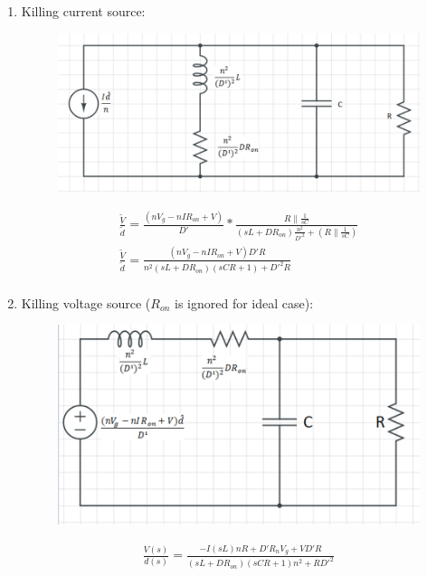 \documentclass{article}
\begin{document}
\begin{enumerate}

    \item Killing current source:
     \begin{figure}[H]
        \centering
        \includegraphics[scale=0.75]{x4.png}
        \label{fig:my_label}
    \end{figure}
    \begin{gather*}
        \frac{\tilde V}{\tilde d}=\frac{(nV_g-nIR_{on}+V)}{D'}*\frac{R\parallel\frac{1}{sC}}{(sL+DR_{on})\frac{n^2}{D'^2}+(R\parallel\frac{1}{sC})}\\
        \frac{\tilde V}{\tilde d}=\frac{(nV_g-nIR_{on}+V)D'R}{n^2(sL+DR_{on})(sCR+1)+D'^2R}\\
    \end{gather*}
    \item Killing voltage source ($R_{on}$ is ignored for ideal case):
     \begin{figure}[H]
        \centering
        \includegraphics[scale=0.75]{x5.png}
        \label{fig:my_label}
    \end{figure}
    \begin{gather*}
        \frac{V(s)}{d(s)}=\frac{-I(sL)nR+D'R_nV_g+VD'R}{(sL+DR_{on})(sCR+1)n^2+RD'^2}\\

\end{gather*}
\end{enumerate}
\end{document}
